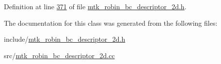 Definition at line \hyperlink{mtk__robin__bc__descriptor__2d_8h_source_l00371}{371} of file \hyperlink{mtk__robin__bc__descriptor__2d_8h_source}{mtk\+\_\+robin\+\_\+bc\+\_\+descriptor\+\_\+2d.\+h}.



The documentation for this class was generated from the following files\+:\begin{DoxyCompactItemize}
\item 
include/\hyperlink{mtk__robin__bc__descriptor__2d_8h}{mtk\+\_\+robin\+\_\+bc\+\_\+descriptor\+\_\+2d.\+h}\item 
src/\hyperlink{mtk__robin__bc__descriptor__2d_8cc}{mtk\+\_\+robin\+\_\+bc\+\_\+descriptor\+\_\+2d.\+cc}\end{DoxyCompactItemize}
